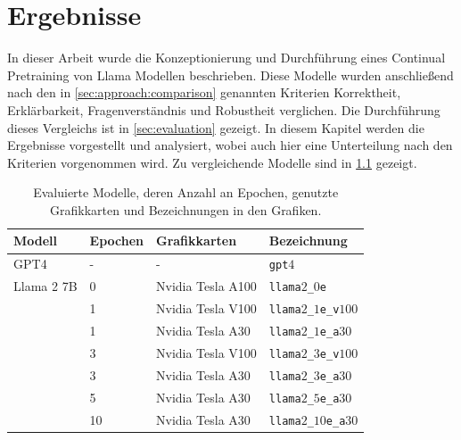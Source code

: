 \chapter{Ergebnisse}\label{ch:results}
\newcommand{\gpt}{\texttt{gpt$4$}}
\newcommand{\lo}{\texttt{llama$2$\_$0$e}}
\newcommand{\liv}{\texttt{llama$2$\_$1$e\_v$100$}}
\newcommand{\lia}{\texttt{llama$2$\_$1$e\_a$30$}}
\newcommand{\lev}{\texttt{llama$2$\_$3$e\_v$100$}}
\newcommand{\lea}{\texttt{llama$2$\_$3$e\_a$30$}}
\newcommand{\lsa}{\texttt{llama$2$\_$5$e\_a$30$}}
\newcommand{\lioa}{\texttt{llama$2$\_$10$e\_a$30$}}

In dieser Arbeit wurde die Konzeptionierung und Durchführung eines Continual Pretraining von Llama Modellen beschrieben.
Diese Modelle wurden anschließend nach den in \cref{sec:approach:comparison} genannten Kriterien Korrektheit, Erklärbarkeit, Fragenverständnis und Robustheit verglichen.
Die Durchführung dieses Vergleichs ist in \cref{sec:evaluation} gezeigt.
In diesem Kapitel werden die Ergebnisse vorgestellt und analysiert, wobei auch hier eine Unterteilung nach den Kriterien vorgenommen wird.
Zu vergleichende Modelle sind in \cref{tab:eval-models} gezeigt.

\begin{table}
    \centering
    \begin{tabular}{llll}
        \toprule
        \textbf{Modell} & \textbf{Epochen} & \textbf{Grafikkarten} & \textbf{Bezeichnung} \\
        \midrule
        GPT4            & -                & -                     & \gpt                 \\
        Llama 2 7B      & 0                & Nvidia Tesla A100     & \lo                  \\
                        & 1                & Nvidia Tesla V100     & \liv                 \\
                        & 1                & Nvidia Tesla A30      & \lia                 \\
                        & 3                & Nvidia Tesla V100     & \lev                 \\
                        & 3                & Nvidia Tesla A30      & \lea                 \\
                        & 5                & Nvidia Tesla A30      & \lsa                 \\
                        & 10               & Nvidia Tesla A30      & \lioa                \\
        \bottomrule
    \end{tabular}
    \caption[Evaluierte Modelle]{Evaluierte Modelle, deren Anzahl an Epochen, genutzte Grafikkarten und Bezeichnungen in den Grafiken.}\label{tab:eval-models}
\end{table}

